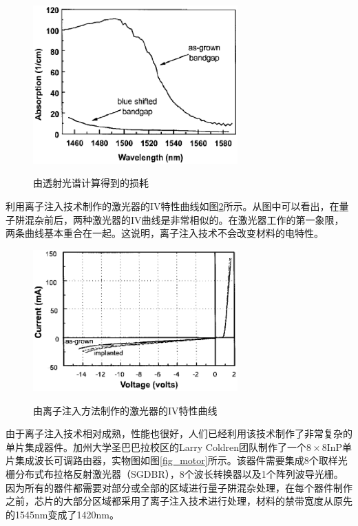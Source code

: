 \documentclass{ZJUthesis}
\begin{document}
\begin{figure}[htb]
  \centering
  \includegraphics[width=0.7\textwidth]{./Pictures/implantation_wg_loss.eps}\\
  \caption{由透射光谱计算得到的损耗}
  \label{fig_implantation_wg_loss}
\end{figure}

利用离子注入技术制作的激光器的IV特性曲线如图\ref{fig_implantation_laser}所示。从图中可以看出，在量子阱混杂前后，两种激光器的IV曲线是非常相似的。在激光器工作的第一象限，两条曲线基本重合在一起。这说明，离子注入技术不会改变材料的电特性。

\begin{figure}[htb]
  \centering
  \includegraphics[width=0.7\textwidth]{./Pictures/implantation_laser.eps}\\
  \caption{由离子注入方法制作的激光器的IV特性曲线}
  \label{fig_implantation_laser}
\end{figure}

由于离子注入技术相对成熟，性能也很好，人们已经利用该技术制作了非常复杂的单片集成器件。加州大学圣巴巴拉校区的Larry Coldren团队制作了一个$8\times8$InP单片集成波长可调路由器\cite{nicholes20108}，实物图如图\ref{fig_motor}所示。该器件需要集成8个取样光栅分布式布拉格反射激光器（SGDBR），8个波长转换器以及1个阵列波导光栅。因为所有的器件都需要对部分或全部的区域进行量子阱混杂处理，在每个器件制作之前，芯片的大部分区域都采用了离子注入技术进行处理，材料的禁带宽度从原先的1545nm变成了1420nm。
\end{document}
